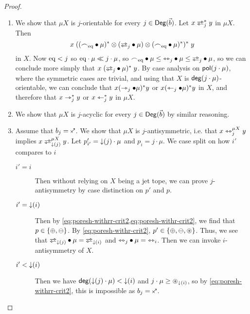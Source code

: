 \documentclass[a4paper]{memoir}
\begin{document}
\begin{proof}
\begin{enumerate}
		\item We show that $\mu X$ is $j$-orientable for every $j \in {\mathsf{Deg}}(\vec b)$. Let $x \infrajet_j^* y$ in $\mu X$.
		Then
		\[
			x \mathrel{((\edgesym_\eqtydeg \oriof \mu)^* \otimes (\infrajetsym_j \oriof \mu) \otimes (\edgesym_\eqtydeg \oriof \mu)^*)^*} y
		\]
		in $X$.
		Now ${\mathrm{eq}} < j$ so ${\mathrm{eq}} \cdot \mu \ll j \cdot \mu$, so $\edgesym_\eqtydeg \oriof \mu \leq \equijetsym_j \oriof \mu \leq \infrajetsym_j \oriof \mu$, so we can conclude more simply that $x \mathrel{(\infrajetsym_j \oriof \mu)^*} y$.
		By case analysis on $\mathsf{pol}(j \cdot \mu)$, where the symmetric cases are trivial, and using that $X$ is $\mathsf{deg}(j \cdot \mu)$-orientable, we can conclude that $x (\rightarrowtriangle_j \mathbin{\bullet} \mu)^* y$ or $x (\leftarrowtriangle_j \mathbin{\bullet} \mu)^* y$ in $X$, and therefore that $x \rightarrowtriangle_j^* y$ or $x \leftarrowtriangle_j^* y$ in $\mu X$.
		
		\item We show that $\mu X$ is $j$-acyclic for every $j \in {\mathsf{Deg}}(\vec b)$ by similar reasoning.
		
		\item Assume that $b_j = \ypolar$.
		We show that $\mu X$ is $j$-antisymmetric, i.e. that $x \leftrightarrowtriangle_j^{\mu X} y$ implies $x \infrajet_{\predeg(j)}^{\mu X} y$.
		Let $p'_{i'} = {\downarrow}(j) \cdot \mu$ and $p_i = j \cdot \mu$.
		We case split on how $i'$ compares to $i$
		\begin{description}
			\item[$i' = i$] Then without relying on $X$ being a jet tope, we can prove $j$-antisymmetry by case distinction on $p'$ and $p$.
			\item[$i' = {\downarrow}(i)$] Then by \cref{eq:poresh-withrr-crit2,eq:poresh-withr-crit2}, we find that $p \in \mathopen{}\left\{ {\oplus}, {\ominus} \right\}\mathclose{}$. By \cref{eq:poresh-withr-crit2}, $p' \in \mathopen{}\left\{ {\oplus}, {\ominus}, {\oast} \right\}\mathclose{}$.
			Thus, we see that $\infrajetsym_{\predeg(j)} \oriof \mu = \infrajetsym_{\predeg(i)}$ and ${\leftrightarrowtriangle}_j \mathbin{\bullet} \mu = {\leftrightarrowtriangle}_i$.
			Then we can invoke $i$-antisymmetry of $X$.
			\item[$i' < {\downarrow}(i)$] Then we have $\mathsf{deg}({\downarrow}(j) \cdot \mu) < {\downarrow}(i)$ and $j \cdot \mu \geq {\oast}_{{\downarrow}(i)}$, so by \cref{eq:poresh-withrr-crit2}, this is impossible as $b_j = \ypolar$. \qedhere
		\end{description}
	\end{enumerate}
\end{proof}
\end{document}
